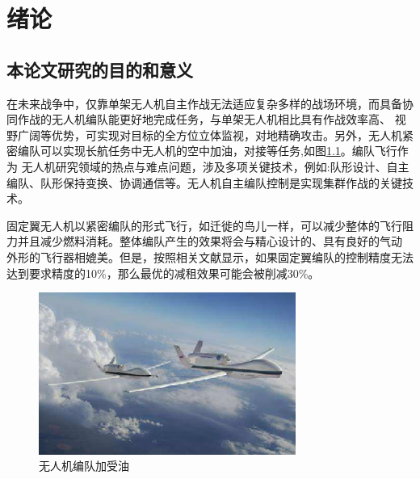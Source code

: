 \chapter{绪论}
\label{chap:intro}
\section{本论文研究的目的和意义}

在未来战争中，仅靠单架无人机自主作战无法适应复杂多样的战场环境，而具备协同作战的无人机编队能更好地完成任务，与单架无人机相比具有作战效率高、
视野广阔等优势，可实现对目标的全方位立体监视，对地精确攻击。另外，无人机紧密编队可以实现长航任务中无人机的空中加油，对接等任务,如图\ref{fig:c01-meaning-1}。编队飞行作为
无人机研究领域的热点与难点问题，涉及多项关键技术，例如:队形设计、自主编队、队形保持变换、协调通信等。无人机自主编队控制是实现集群作战的关键技
术。

固定翼无人机以紧密编队的形式飞行，如迁徙的鸟儿一样，可以减少整体的飞行阻力并且减少燃料消耗。整体编队产生的效果将会与精心设计的、具有良好的气动
外形的飞行器相媲美。但是，按照相关文献显示，如果固定翼编队的控制精度无法达到要求精度的10\%，那么最优的减租效果可能会被削减30\%。
\begin{figure}
  \centering
  \includegraphics[width=0.75\textwidth]{figures/c01-meaning-1}
  \caption{无人机编队加受油}\label{fig:c01-meaning-1}
 \end{figure}

